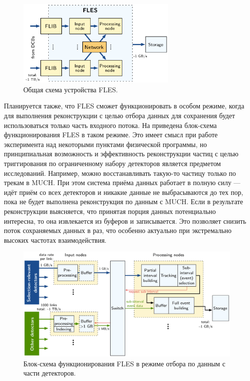 \begin{figure}[H]
\centering
\includegraphics[width=0.7\textwidth]{pictures/FLESarch.png}
\caption{Общая схема устройства FLES.}
\label{fig:FLESarch}
\end{figure}

Планируется также, что FLES сможет функционировать в особом режиме, когда для выполнения реконструкции с целью отбора данных для сохранения будет использоваться только часть входного потока. На  приведена блок-схема функционирования FLES в таком режиме. Это имеет смысл при работе эксперимента над некоторыми пунктами физической программы, но принципиальная возможность и эффективность реконструкции частиц с целью триггирования по ограниченному набору детекторов является предметом исследований. Например, можно восстанавливать \todo такую-то частицу только по трекам в MUCH. При этом система приёма данных работает в полную силу --- идёт приём со всех детекторов и никакие данные не выбрасываются до тех пор, пока не будет выполнена реконструкция по данным с MUCH. Если в результате реконструкции выясняется, что принятая порция данных потенциально интересна, то она извлекается из буферов и записывается. Это позволяет \todo снизить поток сохраняемых данных в \todo раз, что особенно актуально при экстремально высоких частотах взаимодействия.

\begin{figure}[H]
\centering
\includegraphics[width=1.0\textwidth]{pictures/PartialIB.png}
\caption{Блок-схема функционирования FLES в режиме отбора по данным с части детекторов.}
\label{fig:PartialIB}
\end{figure}

